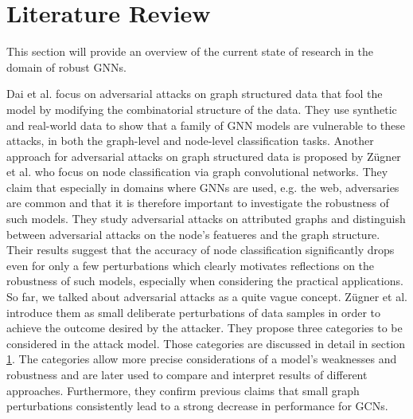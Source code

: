 \documentclass[a4paper,preprint]{sig-alternate}
\begin{document}
\section{Literature Review}

This section will provide an overview of the current state of research in the domain of robust GNNs.\newline

Dai et al. \cite{dai2018adversarial} focus on adversarial attacks on graph structured data that fool the model by modifying the
combinatorial structure of the data. They use synthetic and real-world data to show that a family of GNN models are vulnerable
to these attacks, in both the graph-level and node-level classification tasks.\newline
Another approach for adversarial attacks on graph structured data is proposed by Zügner et al. \cite{Z_gner_2018} who focus on node classification
via graph convolutional networks.
They claim that especially in domains where GNNs are used, e.g. the web, adversaries are common and that it is therefore important
to investigate the robustness of such models. They study adversarial attacks on attributed graphs and distinguish between
adversarial attacks on the node's featueres and the graph structure. Their results suggest that the accuracy of node classification
significantly drops even for only a few perturbations which clearly motivates reflections on the robustness of such models, especially
when considering the practical applications.\newline
So far, we talked about adversarial attacks as a quite vague concept. Zügner et al. \cite{zuegner2019adversarial}
introduce them as small deliberate perturbations of data samples in order to achieve the outcome desired by the attacker.
They propose three categories to be considered in the attack model. Those categories are discussed in detail in section \ref{}.
The categories allow more precise considerations of a model's weaknesses and robustness and are later used to compare and interpret results of 
different approaches. Furthermore, they confirm previous claims that small graph perturbations consistently lead to a strong decrease 
in performance for GCNs.\newline
\end{document}
